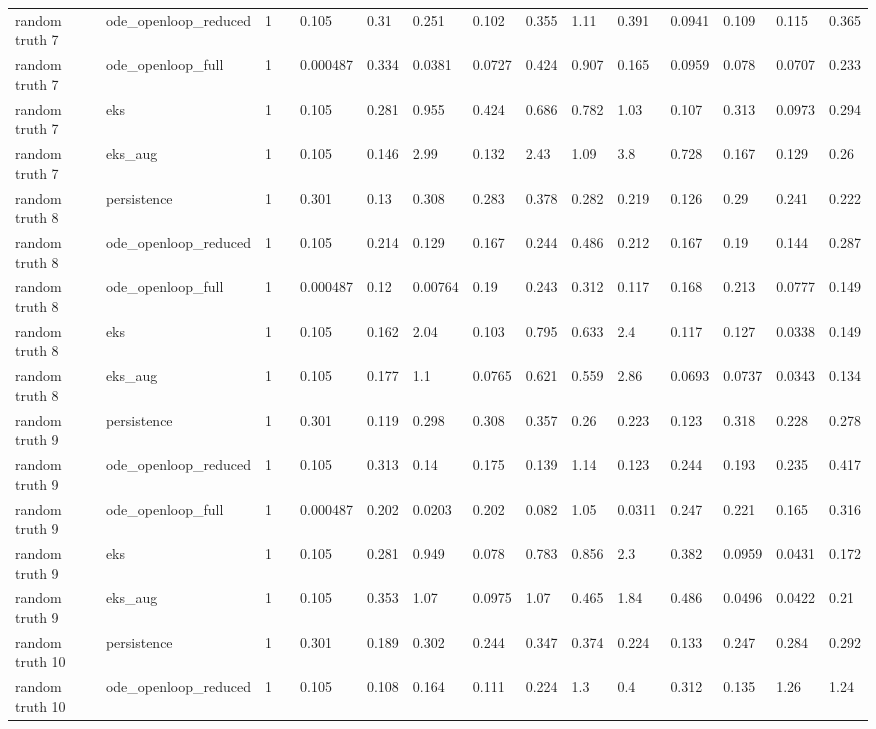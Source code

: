 \begin{table}[t]
\begin{tabular}{lllllllllllllll}
random truth 7 & ode\_openloop\_reduced & 1 &  & 0.105 & 0.31 & 0.251 & 0.102 & 0.355 & 1.11 & 0.391 & 0.0941 & 0.109 & 0.115 & 0.365 \\
random truth 7 & ode\_openloop\_full & 1 &  & 0.000487 & 0.334 & 0.0381 & 0.0727 & 0.424 & 0.907 & 0.165 & 0.0959 & 0.078 & 0.0707 & 0.233 \\
random truth 7 & eks & 1 &  & 0.105 & 0.281 & 0.955 & 0.424 & 0.686 & 0.782 & 1.03 & 0.107 & 0.313 & 0.0973 & 0.294 \\
random truth 7 & eks\_aug & 1 &  & 0.105 & 0.146 & 2.99 & 0.132 & 2.43 & 1.09 & 3.8 & 0.728 & 0.167 & 0.129 & 0.26 \\
random truth 8 & persistence & 1 &  & 0.301 & 0.13 & 0.308 & 0.283 & 0.378 & 0.282 & 0.219 & 0.126 & 0.29 & 0.241 & 0.222 \\
random truth 8 & ode\_openloop\_reduced & 1 &  & 0.105 & 0.214 & 0.129 & 0.167 & 0.244 & 0.486 & 0.212 & 0.167 & 0.19 & 0.144 & 0.287 \\
random truth 8 & ode\_openloop\_full & 1 &  & 0.000487 & 0.12 & 0.00764 & 0.19 & 0.243 & 0.312 & 0.117 & 0.168 & 0.213 & 0.0777 & 0.149 \\
random truth 8 & eks & 1 &  & 0.105 & 0.162 & 2.04 & 0.103 & 0.795 & 0.633 & 2.4 & 0.117 & 0.127 & 0.0338 & 0.149 \\
random truth 8 & eks\_aug & 1 &  & 0.105 & 0.177 & 1.1 & 0.0765 & 0.621 & 0.559 & 2.86 & 0.0693 & 0.0737 & 0.0343 & 0.134 \\
random truth 9 & persistence & 1 &  & 0.301 & 0.119 & 0.298 & 0.308 & 0.357 & 0.26 & 0.223 & 0.123 & 0.318 & 0.228 & 0.278 \\
random truth 9 & ode\_openloop\_reduced & 1 &  & 0.105 & 0.313 & 0.14 & 0.175 & 0.139 & 1.14 & 0.123 & 0.244 & 0.193 & 0.235 & 0.417 \\
random truth 9 & ode\_openloop\_full & 1 &  & 0.000487 & 0.202 & 0.0203 & 0.202 & 0.082 & 1.05 & 0.0311 & 0.247 & 0.221 & 0.165 & 0.316 \\
random truth 9 & eks & 1 &  & 0.105 & 0.281 & 0.949 & 0.078 & 0.783 & 0.856 & 2.3 & 0.382 & 0.0959 & 0.0431 & 0.172 \\
random truth 9 & eks\_aug & 1 &  & 0.105 & 0.353 & 1.07 & 0.0975 & 1.07 & 0.465 & 1.84 & 0.486 & 0.0496 & 0.0422 & 0.21 \\
random truth 10 & persistence & 1 &  & 0.301 & 0.189 & 0.302 & 0.244 & 0.347 & 0.374 & 0.224 & 0.133 & 0.247 & 0.284 & 0.292 \\
random truth 10 & ode\_openloop\_reduced & 1 &  & 0.105 & 0.108 & 0.164 & 0.111 & 0.224 & 1.3 & 0.4 & 0.312 & 0.135 & 1.26 & 1.24 \\

\end{tabular}
\end{table}
